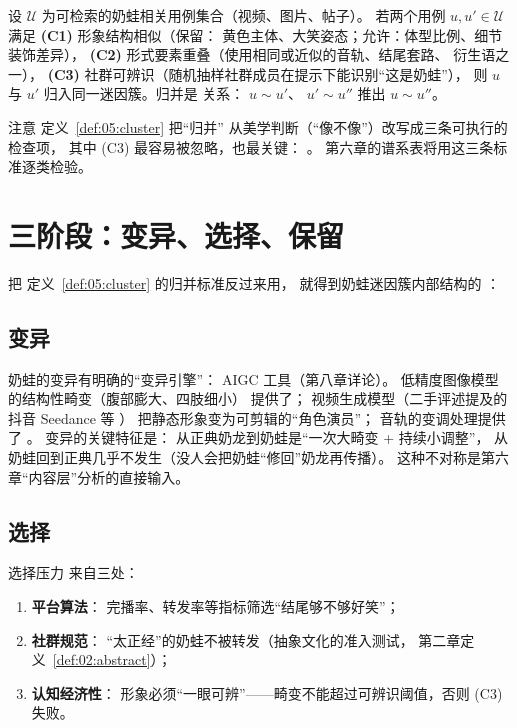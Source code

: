 \begin{definition}
  \label{def:05:cluster}
设 $\mathcal{U}$ 为可检索的奶蛙相关用例集合（视频、图片、帖子）。
 若两个用例 $u, u' \in \mathcal{U}$ 满足 \textbf{(C1)} 形象结构相似（保留：
黄色主体、大笑姿态；允许：体型比例、细节装饰差异），
 \textbf{(C2)} 形式要素重叠（使用相同或近似的音轨、结尾套路、
 衍生语之一），
 \textbf{(C3)} 社群可辨识（随机抽样社群成员在提示下能识别“这是奶蛙”），
 则 $u$ 与 $u'$ 归入同一迷因簇。归并是 关系：
$u \sim u'$、 $u' \sim u''$ 推出 $u \sim u''$。
\end{definition}

注意 定义~\ref{def:05:cluster} 把“归并”
从美学判断（“像不像”）改写成三条可执行的检查项，
 其中 (C3) 最容易被忽略，也最关键：
 。
 第六章的谱系表将用这三条标准逐类检验。

\section{三阶段：变异、选择、保留}\label{sec:05:stages}

把 定义~\ref{def:05:cluster} 的归并标准反过来用，
 就得到奶蛙迷因簇内部结构的 ：

\subsection{变异}

奶蛙的变异有明确的“变异引擎”： AIGC 工具（第八章详论）。
 低精度图像模型的结构性畸变（腹部膨大、四肢细小）
 提供了；
 视频生成模型（二手评述提及的抖音 Seedance 等 \cite{shoutanji2026naiwa}）
 把静态形象变为可剪辑的“角色演员”；
 音轨的变调处理提供了 。
 变异的关键特征是：
 从正典奶龙到奶蛙是“一次大畸变 + 持续小调整”，
 从奶蛙回到正典几乎不发生（没人会把奶蛙“修回”奶龙再传播）。
 这种不对称是第六章“内容层”分析的直接输入。

\subsection{选择}

选择压力
来自三处：

\begin{enumerate}[label=\arabic*.]
  \item \textbf{平台算法}：
完播率、转发率等指标筛选“结尾够不够好笑”；
  \item \textbf{社群规范}：
“太正经”的奶蛙不被转发（抽象文化的准入测试，
 第二章定义~\ref{def:02:abstract}）；
  \item \textbf{认知经济性}：
形象必须“一眼可辨”——畸变不能超过可辨识阈值，否则 (C3) 失败。
\end{enumerate}

